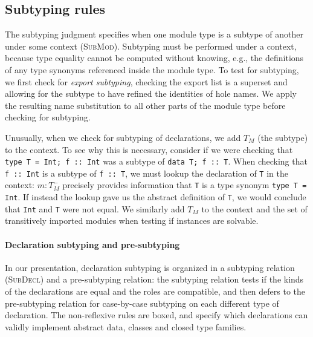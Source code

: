 
\subsection{Subtyping rules}
\label{sec:subtyping}




The subtyping judgment specifies when one module type
is a subtype of another under some context (\textsc{SubMod}).
Subtyping must be performed under a context, because type equality
cannot be computed without knowing, e.g., the definitions of any
type synonyms referenced inside the module type.  To test for
subtyping, we first check for \emph{export subtyping}, checking
the export list is a superset and allowing for the subtype to have
refined the identities of hole names.  We apply the resulting
name substitution to all other parts of the module type before
checking for subtyping.

Unusually, when we check for subtyping of declarations, we add $T_M$ (the subtype)
to the context.  To see why this is necessary, consider if we were
checking that \verb|type T = Int; f :: Int| was a subtype of \verb|data T; f :: T|.
When checking that \verb|f :: Int| is a subtype of \verb|f :: T|, we must lookup
the declaration of \verb|T| in the context: $m : T_M^-$ precisely provides
information that \verb|T| is a type synonym \verb|type T = Int|.  If
instead the lookup gave us the abstract definition of \verb|T|, we would conclude
that \verb|Int| and \verb|T| were not equal.  We similarly add $T_M$ to
the context and the set of transitively imported modules when testing if instances are solvable.

\paragraph{Declaration subtyping and pre-subtyping}
In our presentation, declaration subtyping is organized in a subtyping
relation (\textsc{SubDecl}) and a pre-subtyping relation: the subtyping
relation tests if the kinds of the declarations are equal and the roles
are compatible, and then defers to the pre-subtyping relation for
case-by-case subtyping on each different type of declaration.  The
non-reflexive rules are boxed, and specify which declarations can
validly implement abstract data, classes and closed type families.


